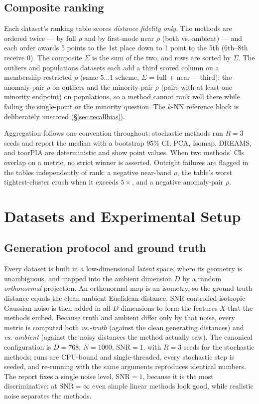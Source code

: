 \documentclass[11pt]{article}
\begin{document}
\subsection{Composite ranking}
\label{sec:composite}

Each dataset's ranking table scores \emph{distance fidelity only}. The
methods are ordered twice --- by full $\rho$ and by first-mode near $\rho$
(both vs.-ambient) --- and each order awards 5 points to the 1st place down
to 1 point to the 5th (6th--8th receive 0). The composite $\Sigma$ is the
sum of the two, and rows are sorted by $\Sigma$. The outliers and
populations datasets each add a third scored column on a
membership-restricted $\rho$ (same $5\ldots1$ scheme, $\Sigma$ = full +
near + third): the anomaly-pair $\rho$ on outliers and the minority-pair
$\rho$ (pairs with at least one minority endpoint) on populations, so a
method cannot rank well there while failing the single-point or the
minority question. The $k$-NN reference block is deliberately
unscored (\S\ref{sec:recallbias}).

Aggregation follows one convention throughout: stochastic methods run
$R{=}3$ seeds and report the median with a bootstrap 95\% CI; PCA, Isomap,
DREAMS, and toorPIA are deterministic and show point values. When two
methods' CIs overlap on a metric, no strict winner is asserted. Outright failures are
flagged in the tables independently of rank: a negative near-band $\rho$, the
table's worst tightest-cluster crush when it exceeds $5\times$, and a
negative anomaly-pair $\rho$.

\section{Datasets and Experimental Setup}
\label{sec:datasets}

\subsection{Generation protocol and ground truth}
\label{sec:protocol}

Every dataset is built in a low-dimensional \emph{latent} space, where its
geometry is unambiguous, and mapped into the ambient dimension $D$ by a
random \emph{orthonormal} projection. An orthonormal map is an isometry, so
the ground-truth distance equals the clean ambient Euclidean distance.
SNR-controlled isotropic Gaussian noise is then added in all $D$ dimensions
to form the features $X$ that the methods embed. Because truth and ambient
differ only by that noise, every metric is computed both \emph{vs.-truth}
(against the clean generating distances) and \emph{vs.-ambient} (against the
noisy distances the method actually saw). The canonical configuration is
$D{=}768$, $N{=}1000$, SNR${=}1$, with $R{=}3$ seeds for the stochastic
methods; runs are CPU-bound and single-threaded, every stochastic step is
seeded, and re-running with the same arguments reproduces identical numbers.
The report fixes a single noise level, SNR${=}1$, because it is the most
discriminative: at SNR${=}\infty$ even simple linear methods look good, while
realistic noise separates the methods.
\end{document}
